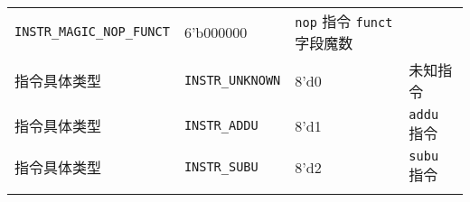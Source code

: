 \begin{longtable}[]{@{}llll@{}}
\begin{minipage}[t]{0.22\columnwidth}
\texttt{INSTR\_MAGIC\_NOP\_FUNCT}\strut
\end{minipage} & \begin{minipage}[t]{0.22\columnwidth}\raggedright
6'b000000\strut
\end{minipage} & \begin{minipage}[t]{0.22\columnwidth}\raggedright
\texttt{nop} 指令 \texttt{funct} 字段魔数\strut
\end{minipage}\tabularnewline
\begin{minipage}[t]{0.22\columnwidth}\raggedright
指令具体类型\strut
\end{minipage} & \begin{minipage}[t]{0.22\columnwidth}\raggedright
\texttt{INSTR\_UNKNOWN}\strut
\end{minipage} & \begin{minipage}[t]{0.22\columnwidth}\raggedright
8'd0\strut
\end{minipage} & \begin{minipage}[t]{0.22\columnwidth}\raggedright
未知指令\strut
\end{minipage}\tabularnewline
\begin{minipage}[t]{0.22\columnwidth}\raggedright
指令具体类型\strut
\end{minipage} & \begin{minipage}[t]{0.22\columnwidth}\raggedright
\texttt{INSTR\_ADDU}\strut
\end{minipage} & \begin{minipage}[t]{0.22\columnwidth}\raggedright
8'd1\strut
\end{minipage} & \begin{minipage}[t]{0.22\columnwidth}\raggedright
\texttt{addu} 指令\strut
\end{minipage}\tabularnewline
\begin{minipage}[t]{0.22\columnwidth}\raggedright
指令具体类型\strut
\end{minipage} & \begin{minipage}[t]{0.22\columnwidth}\raggedright
\texttt{INSTR\_SUBU}\strut
\end{minipage} & \begin{minipage}[t]{0.22\columnwidth}\raggedright
8'd2\strut
\end{minipage} & \begin{minipage}[t]{0.22\columnwidth}\raggedright
\texttt{subu} 指令\strut
\end{minipage}\tabularnewline
\begin{minipage}[t]{0.22\columnwidth}\raggedright

\end{minipage}
\end{longtable}
